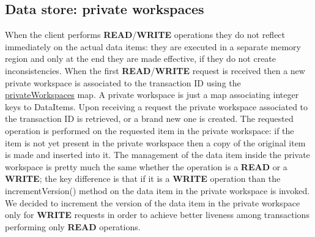 \subsection{Data store: private workspaces}
When the client performs \textbf{READ}/\textbf{WRITE} operations they do not reflect immediately on the actual data items: they are executed in a separate memory region and only at the end they are made effective, if they do not create inconsistencies.
\newline
When the first \textbf{READ}/\textbf{WRITE} request is received then a new private workspace is associated to the transaction ID using the \url{privateWorkspaces} map.
\newline
A private workspace is just a map associating integer keys to DataItems.
\newline
Upon receiving a request the private workspace associated to the transaction ID is retrieved, or a brand new one is created. The requested operation is performed on the requested item in the private workspace: if the item is not yet present in the private workspace then a copy of the original item is made and inserted into it.
\newline
The management of the data item inside the private workspace is pretty much the same whether the operation is a \textbf{READ} or a \textbf{WRITE}; the key difference is that if it is a \textbf{WRITE} operation than the incrementVersion() method on the data item in the private workspace is invoked.
We decided to increment the version of the data item in the private workspace only for \textbf{WRITE} requests in order to achieve better liveness among transactions performing only \textbf{READ} operations.

